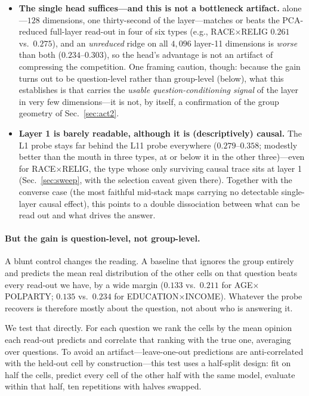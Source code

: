 \begin{itemize}
  \item \textbf{The single head suffices---and this is not a bottleneck
        artifact.} \starhead{} alone---$128$ dimensions, one
        thirty-second of the layer---matches or beats the PCA-reduced
        full-layer read-out in four of six types (e.g.,
        RACE$\times$RELIG $0.261$ vs.\ $0.275$), and an
        \emph{unreduced} ridge on all $4{,}096$ layer-11 dimensions is
        \emph{worse} than both ($0.234$--$0.303$), so the head's
        advantage is not an artifact of compressing the competition. One
        framing caution, though: because the gain turns out to be
        question-level rather than group-level (below), what this
        establishes is that \starhead{} carries the \emph{usable
        question-conditioning signal} of the layer in very few
        dimensions---it is not, by itself, a confirmation of the
        group geometry of Sec.~\ref{sec:act2}.
  \item \textbf{Layer 1 is barely readable, although it is (descriptively)
        causal.} The L1 probe stays far behind the L11 probe everywhere
        ($0.279$--$0.358$; modestly better than the mouth in three
        types, at or below it in the other three)---even for
        RACE$\times$RELIG, the type whose
        only surviving causal trace sits at layer 1
        (Sec.~\ref{sec:sweep}, with the selection caveat given there).
        Together with the converse case (the most faithful mid-stack maps
        carrying no detectable single-layer causal effect), this points to a double
        dissociation between what can be read out and what drives the
        answer.
\end{itemize}

\paragraph{But the gain is question-level, not group-level.} A blunt
control changes the reading. A baseline that ignores the group entirely
and predicts the mean real distribution of the other cells on that
question beats every read-out we have, by a wide margin ($0.133$ vs.\
$0.211$ for AGE$\times$POLPARTY; $0.135$ vs.\ $0.234$ for
EDUCATION$\times$INCOME). Whatever the probe recovers is therefore mostly
about the question, not about who is answering it.

We test that directly. For each question we rank the cells by the mean
opinion each read-out predicts and correlate that ranking with the true
one, averaging over questions. To avoid an artifact---leave-one-out
predictions are anti-correlated with the held-out cell by
construction---this test uses a half-split design: fit on half the cells,
predict every cell of the other half with the same model, evaluate within
that half, ten repetitions with halves swapped.

